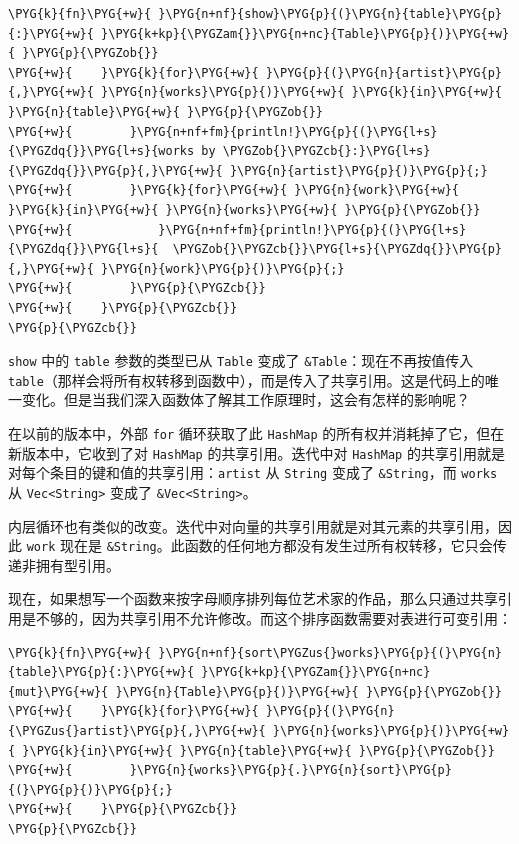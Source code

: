 \begin{Verbatim}[commandchars=\\\{\},breaklines=true,breakanywhere=true,fontsize=\codefont,xleftmargin=17bp]
\PYG{k}{fn}\PYG{+w}{ }\PYG{n+nf}{show}\PYG{p}{(}\PYG{n}{table}\PYG{p}{:}\PYG{+w}{ }\PYG{k+kp}{\PYGZam{}}\PYG{n+nc}{Table}\PYG{p}{)}\PYG{+w}{ }\PYG{p}{\PYGZob{}}
\PYG{+w}{    }\PYG{k}{for}\PYG{+w}{ }\PYG{p}{(}\PYG{n}{artist}\PYG{p}{,}\PYG{+w}{ }\PYG{n}{works}\PYG{p}{)}\PYG{+w}{ }\PYG{k}{in}\PYG{+w}{ }\PYG{n}{table}\PYG{+w}{ }\PYG{p}{\PYGZob{}}
\PYG{+w}{        }\PYG{n+nf+fm}{println!}\PYG{p}{(}\PYG{l+s}{\PYGZdq{}}\PYG{l+s}{works by \PYGZob{}\PYGZcb{}:}\PYG{l+s}{\PYGZdq{}}\PYG{p}{,}\PYG{+w}{ }\PYG{n}{artist}\PYG{p}{)}\PYG{p}{;}
\PYG{+w}{        }\PYG{k}{for}\PYG{+w}{ }\PYG{n}{work}\PYG{+w}{ }\PYG{k}{in}\PYG{+w}{ }\PYG{n}{works}\PYG{+w}{ }\PYG{p}{\PYGZob{}}
\PYG{+w}{            }\PYG{n+nf+fm}{println!}\PYG{p}{(}\PYG{l+s}{\PYGZdq{}}\PYG{l+s}{  \PYGZob{}\PYGZcb{}}\PYG{l+s}{\PYGZdq{}}\PYG{p}{,}\PYG{+w}{ }\PYG{n}{work}\PYG{p}{)}\PYG{p}{;}
\PYG{+w}{        }\PYG{p}{\PYGZcb{}}
\PYG{+w}{    }\PYG{p}{\PYGZcb{}}
\PYG{p}{\PYGZcb{}}
\end{Verbatim}

\texttt{show} 中的 \texttt{table} 参数的类型已从 \texttt{Table} 变成了 \texttt{\&Table}：现在不再按值传入 \texttt{table}（那样会将所有权转移到函数中），而是传入了共享引用。这是代码上的唯一变化。但是当我们深入函数体了解其工作原理时，这会有怎样的影响呢？

在以前的版本中，外部 \texttt{for} 循环获取了此 \texttt{HashMap} 的所有权并消耗掉了它，但在新版本中，它收到了对 \texttt{HashMap} 的共享引用。迭代中对 \texttt{HashMap} 的共享引用就是对每个条目的键和值的共享引用：\texttt{artist} 从 \texttt{String} 变成了 \texttt{\&String}，而 \texttt{works} 从 \texttt{Vec<String>} 变成了 \texttt{\&Vec<String>}。

内层循环也有类似的改变。迭代中对向量的共享引用就是对其元素的共享引用，因此 \texttt{work} 现在是 \texttt{\&String}。此函数的任何地方都没有发生过所有权转移，它只会传递非拥有型引用。

现在，如果想写一个函数来按字母顺序排列每位艺术家的作品，那么只通过共享引用是不够的，因为共享引用不允许修改。而这个排序函数需要对表进行可变引用：

\begin{Verbatim}[commandchars=\\\{\},breaklines=true,breakanywhere=true,fontsize=\codefont,xleftmargin=17bp]
\PYG{k}{fn}\PYG{+w}{ }\PYG{n+nf}{sort\PYGZus{}works}\PYG{p}{(}\PYG{n}{table}\PYG{p}{:}\PYG{+w}{ }\PYG{k+kp}{\PYGZam{}}\PYG{n+nc}{mut}\PYG{+w}{ }\PYG{n}{Table}\PYG{p}{)}\PYG{+w}{ }\PYG{p}{\PYGZob{}}
\PYG{+w}{    }\PYG{k}{for}\PYG{+w}{ }\PYG{p}{(}\PYG{n}{\PYGZus{}artist}\PYG{p}{,}\PYG{+w}{ }\PYG{n}{works}\PYG{p}{)}\PYG{+w}{ }\PYG{k}{in}\PYG{+w}{ }\PYG{n}{table}\PYG{+w}{ }\PYG{p}{\PYGZob{}}
\PYG{+w}{        }\PYG{n}{works}\PYG{p}{.}\PYG{n}{sort}\PYG{p}{(}\PYG{p}{)}\PYG{p}{;}
\PYG{+w}{    }\PYG{p}{\PYGZcb{}}
\PYG{p}{\PYGZcb{}}
\end{Verbatim}

